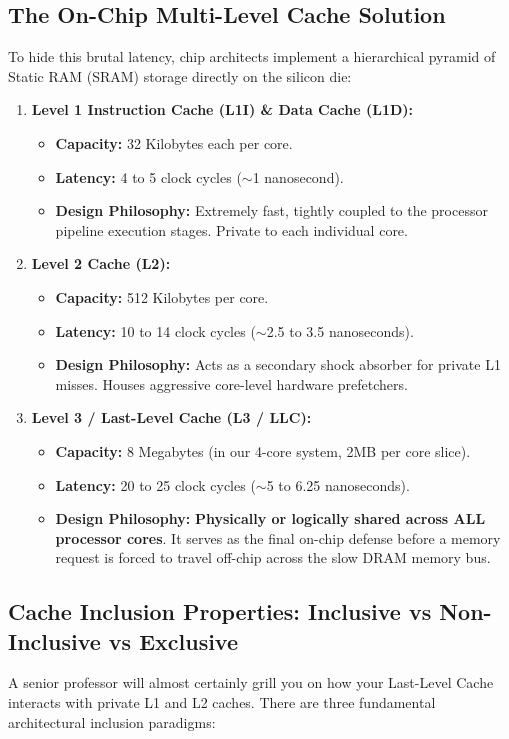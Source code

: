 \documentclass[11pt, a4paper]{article}
\begin{document}
\subsection{The On-Chip Multi-Level Cache Solution}
To hide this brutal latency, chip architects implement a hierarchical pyramid of Static RAM (SRAM) storage directly on the silicon die:
\begin{enumerate}[leftmargin=1.5em]
  \item \textbf{Level 1 Instruction Cache (L1I) \& Data Cache (L1D):}
  \begin{itemize}
    \item \textbf{Capacity:} 32 Kilobytes each per core.
    \item \textbf{Latency:} 4 to 5 clock cycles ($\sim$1 nanosecond).
    \item \textbf{Design Philosophy:} Extremely fast, tightly coupled to the processor pipeline execution stages. Private to each individual core.
  \end{itemize}

  \item \textbf{Level 2 Cache (L2):}
  \begin{itemize}
    \item \textbf{Capacity:} 512 Kilobytes per core.
    \item \textbf{Latency:} 10 to 14 clock cycles ($\sim$2.5 to 3.5 nanoseconds).
    \item \textbf{Design Philosophy:} Acts as a secondary shock absorber for private L1 misses. Houses aggressive core-level hardware prefetchers.
  \end{itemize}

  \item \textbf{Level 3 / Last-Level Cache (L3 / LLC):}
  \begin{itemize}
    \item \textbf{Capacity:} 8 Megabytes (in our 4-core system, 2MB per core slice).
    \item \textbf{Latency:} 20 to 25 clock cycles ($\sim$5 to 6.25 nanoseconds).
    \item \textbf{Design Philosophy:} \textbf{Physically or logically shared across ALL processor cores}. It serves as the final on-chip defense before a memory request is forced to travel off-chip across the slow DRAM memory bus.
  \end{itemize}
\end{enumerate}

\subsection{Cache Inclusion Properties: Inclusive vs Non-Inclusive vs Exclusive}
A senior professor will almost certainly grill you on how your Last-Level Cache interacts with private L1 and L2 caches. There are three fundamental architectural inclusion paradigms:
\end{document}
